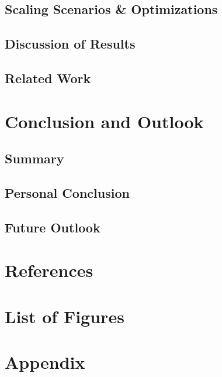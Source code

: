 \documentclass[11pt, a4paper, oneside, draft]{scrartcl}
\begin{document}
        \subsection{Scaling Scenarios \& Optimizations}

        \subsection{Discussion of Results}

        \subsection{Related Work}

    \section{Conclusion and Outlook}

        \subsection{Summary}

        \subsection{Personal Conclusion}

        \subsection{Future Outlook}

    \section*{References}
        \printbibliography[heading=none]

    \section*{List of Figures}
        \begingroup
            \renewcommand{\listfigurename}{} %
            \listoffigures
        \endgroup

    \section*{Appendix}
\end{document}
